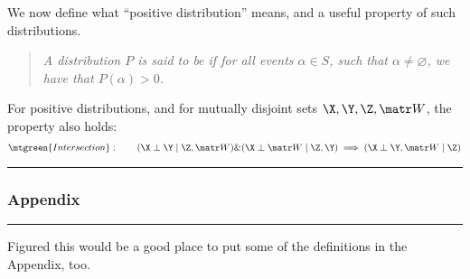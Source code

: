 \documentclass[11pt]{article}
\newcommand\myspace[1][]{\vspace{#1\bigskipamount}}
\newcommand\subsub[1]{\Needspace{15\baselineskip}\hrule\subsubsection{#1}\hrule}
\begin{document}
We now define what ``positive distribution'' means, and a useful property of such distributions.
\vspace{-0.5em}
\begin{quote}
{\footnotesize\itshape
	A distribution $P$ is said to be  if for all events $\alpha \in S$, such that $\alpha \ne \varnothing$, we have that $P(\alpha) > 0$. 	
}
\end{quote}
For positive distributions, and for mutually disjoint sets $\X, \Y, \Z, \matr W$, the  property also holds:
\begin{align}
	\mtgreen{Intersection}:\qquad (\X \perp \Y \mid \Z, \matr W) \& (\X \perp \matr W \mid \Z, \Y) \implies (\X \perp \Y, \matr W \mid \Z)
\end{align}
\begin{comment}
\begin{example}[Proof: Intersection for Positive $P$]
I'm going to stop bolding because I'm lazy.
	\begin{align}
		P(X, Y, W \mid Z) 
		&= P(Y \mid Z) P(X, W \mid Z, Y) \\
		&= P(Y \mid Z) P(X \mid Z, Y) P(W \mid Z, Y) \\
		&= P(X \mid Z, Y) P(Y, W \mid Z) \\
		&= P(X \mid Z) P(Y, W \mid Z)
	\end{align}
\end{example}
\end{comment}



\myspace
\subsub{Appendix}
\myspace

Figured this would be a good place to put some of the definitions in the Appendix, too. \\
\end{document}
